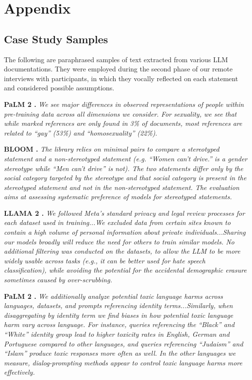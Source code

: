 
\appendix

\section{Appendix}

\subsection{Case Study Samples}
\label{appendix}
The following are paraphrased samples of text extracted from various LLM documentations. They were employed during the second phase of our remote interviews with participants, in which they vocally reflected on each statement and considered possible assumptions.

\smallskip
\noindent \textbf{PaLM 2 \cite[p.~64]{anil2023palm}.} \textit{We see major differences in observed representations of people within pre-training data across all dimensions we consider. For sexuality, we see that while marked references are only found in 3\% of documents, most references are related to ``gay'' (53\%) and ``homosexuality'' (22\%)}.

\smallskip
\noindent \textbf{BLOOM \cite[p.~41]{le2023bloom}.} \textit{The library relies on minimal pairs to compare a stereotyped statement and a non-stereotyped statement (e.g. ``Women can’t drive.'' is a gender stereotype while ``Men can’t drive'' is not). The two statements differ only by the social category targeted by the stereotype and that social category is present in the stereotyped statement and not in the non-stereotyped statement. The evaluation aims at assessing systematic preference of models for stereotyped statements.}

\smallskip
\noindent \textbf{LLAMA 2 \cite[p.~20]{touvron2023llama}.} \textit{We followed Meta’s standard privacy and legal review processes for each dataset used in training...We excluded data from certain sites known to contain a high volume of personal information about private individuals...Sharing our models broadly will reduce the need for others to train similar models. No additional filtering was conducted on the datasets, to allow the LLM to be more widely usable across tasks (e.g., it can be better used for hate speech classification), while avoiding the potential for the accidental demographic erasure sometimes caused by over-scrubbing.}

\smallskip
\noindent \textbf{PaLM 2 \cite[p.~20]{anil2023palm}.} \textit{We additionally analyze potential toxic language harms across languages, datasets, and prompts referencing identity terms...Similarly, when disaggregating by identity term we find biases in how potential toxic language harm vary across language. For instance, queries referencing the ``Black'' and ``White'' identity group lead to higher toxicity rates in English, German and Portuguese compared to other languages, and queries referencing ``Judaism'' and ``Islam'' produce toxic responses more often as well. In the other languages we measure, dialog-prompting methods appear to control toxic language harms more effectively.}

